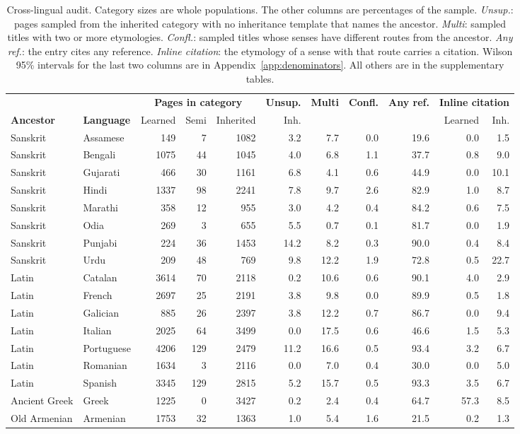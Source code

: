 \documentclass[11pt]{article}
\begin{document}
\begin{table}[t]
\centering\small
\begin{tabular}{llrrrrrrrrr}
\toprule
& & \multicolumn{3}{c}{\textbf{Pages in category}} & \textbf{Unsup.} & \textbf{Multi} & \textbf{Confl.} & \textbf{Any ref.} & \multicolumn{2}{c}{\textbf{Inline citation}} \\
\textbf{Ancestor} & \textbf{Language} & Learned & Semi & Inherited & Inh. & & & & Learned & Inh. \\
\midrule
Sanskrit & Assamese & 149 & 7 & 1082 & 3.2 & 7.7 & 0.0 & 19.6 & 0.0 & 1.5 \\
Sanskrit & Bengali & 1075 & 44 & 1045 & 4.0 & 6.8 & 1.1 & 37.7 & 0.8 & 9.0 \\
Sanskrit & Gujarati & 466 & 30 & 1161 & 6.8 & 4.1 & 0.6 & 44.9 & 0.0 & 10.1 \\
Sanskrit & Hindi & 1337 & 98 & 2241 & 7.8 & 9.7 & 2.6 & 82.9 & 1.0 & 8.7 \\
Sanskrit & Marathi & 358 & 12 & 955 & 3.0 & 4.2 & 0.4 & 84.2 & 0.6 & 7.5 \\
Sanskrit & Odia & 269 & 3 & 655 & 5.5 & 0.7 & 0.1 & 81.7 & 0.0 & 1.9 \\
Sanskrit & Punjabi & 224 & 36 & 1453 & 14.2 & 8.2 & 0.3 & 90.0 & 0.4 & 8.4 \\
Sanskrit & Urdu & 209 & 48 & 769 & 9.8 & 12.2 & 1.9 & 72.8 & 0.5 & 22.7 \\
\midrule
Latin & Catalan & 3614 & 70 & 2118 & 0.2 & 10.6 & 0.6 & 90.1 & 4.0 & 2.9 \\
Latin & French & 2697 & 25 & 2191 & 3.8 & 9.8 & 0.0 & 89.9 & 0.5 & 1.8 \\
Latin & Galician & 885 & 26 & 2397 & 3.8 & 12.2 & 0.7 & 86.7 & 0.0 & 9.4 \\
Latin & Italian & 2025 & 64 & 3499 & 0.0 & 17.5 & 0.6 & 46.6 & 1.5 & 5.3 \\
Latin & Portuguese & 4206 & 129 & 2479 & 11.2 & 16.6 & 0.5 & 93.4 & 3.2 & 6.7 \\
Latin & Romanian & 1634 & 3 & 2116 & 0.0 & 7.0 & 0.4 & 30.0 & 0.0 & 5.0 \\
Latin & Spanish & 3345 & 129 & 2815 & 5.2 & 15.7 & 0.5 & 93.3 & 3.5 & 6.7 \\
\midrule
Ancient Greek & Greek & 1225 & 0 & 3427 & 0.2 & 2.4 & 0.4 & 64.7 & 57.3 & 8.5 \\
\midrule
Old Armenian & Armenian & 1753 & 32 & 1363 & 1.0 & 5.4 & 1.6 & 21.5 & 0.2 & 1.3 \\
\bottomrule
\end{tabular}
\caption{Cross-lingual audit. Category sizes are whole populations. The other columns are percentages of the sample. \textit{Unsup.}: pages sampled from the inherited category with no inheritance template that names the ancestor. \textit{Multi}: sampled titles with two or more etymologies. \textit{Confl.}: sampled titles whose senses have different routes from the ancestor. \textit{Any ref.}: the entry cites any reference. \textit{Inline citation}: the etymology of a sense with that route carries a citation. Wilson 95\% intervals for the last two columns are in Appendix~\ref{app:denominators}. All others are in the supplementary tables.}
\label{tab:audit}
\end{table}
\end{document}
